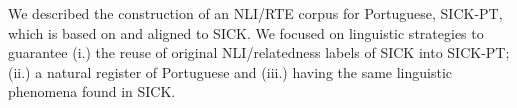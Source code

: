 We described the construction of an NLI/RTE corpus for Portuguese, SICK-PT, which is based on and aligned to SICK. We focused on linguistic strategies to guarantee (i.) the reuse of original NLI/relatedness labels of SICK into SICK-PT; (ii.) a natural register of Portuguese and (iii.) having the same linguistic phenomena found in SICK.
